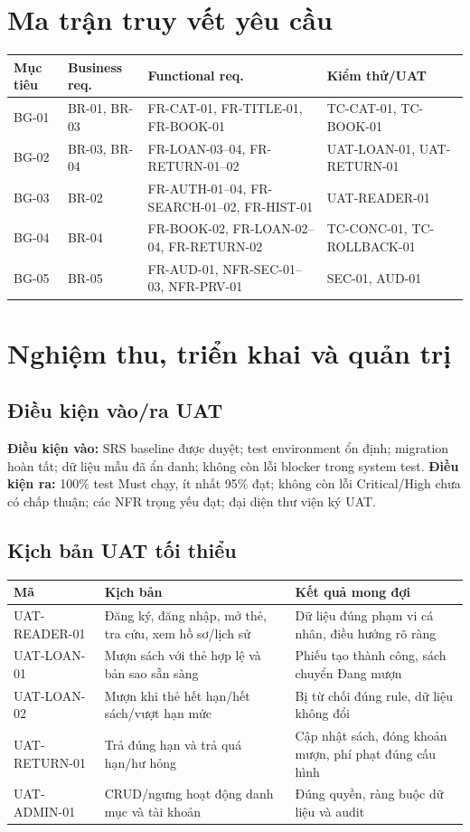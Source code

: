 \documentclass[12pt,a4paper,oneside]{report}
\begin{document}
\chapter{Ma trận truy vết yêu cầu}
\begin{longtable}{L{2cm}L{4.5cm}L{4.1cm}L{3.4cm}}
\toprule Mục tiêu & Business req. & Functional req. & Kiểm thử/UAT\\\midrule\endhead
BG-01 & BR-01, BR-03 & FR-CAT-01, FR-TITLE-01, FR-BOOK-01 & TC-CAT-01, TC-BOOK-01\\
BG-02 & BR-03, BR-04 & FR-LOAN-03--04, FR-RETURN-01--02 & UAT-LOAN-01, UAT-RETURN-01\\
BG-03 & BR-02 & FR-AUTH-01--04, FR-SEARCH-01--02, FR-HIST-01 & UAT-READER-01\\
BG-04 & BR-04 & FR-BOOK-02, FR-LOAN-02--04, FR-RETURN-02 & TC-CONC-01, TC-ROLLBACK-01\\
BG-05 & BR-05 & FR-AUD-01, NFR-SEC-01--03, NFR-PRV-01 & SEC-01, AUD-01\\
\bottomrule
\end{longtable}

\chapter{Nghiệm thu, triển khai và quản trị}
\section{Điều kiện vào/ra UAT}
\textbf{Điều kiện vào:} SRS baseline được duyệt; test environment ổn định; migration hoàn tất; dữ liệu mẫu đã ẩn danh; không còn lỗi blocker trong system test. \textbf{Điều kiện ra:} 100\% test Must chạy, ít nhất 95\% đạt; không còn lỗi Critical/High chưa có chấp thuận; các NFR trọng yếu đạt; đại diện thư viện ký UAT.

\section{Kịch bản UAT tối thiểu}
\begin{longtable}{L{2.5cm}L{7cm}L{5cm}}
\toprule Mã & Kịch bản & Kết quả mong đợi\\\midrule\endhead
UAT-READER-01 & Đăng ký, đăng nhập, mở thẻ, tra cứu, xem hồ sơ/lịch sử & Dữ liệu đúng phạm vi cá nhân, điều hướng rõ ràng\\
UAT-LOAN-01 & Mượn sách với thẻ hợp lệ và bản sao sẵn sàng & Phiếu tạo thành công, sách chuyển Đang mượn\\
UAT-LOAN-02 & Mượn khi thẻ hết hạn/hết sách/vượt hạn mức & Bị từ chối đúng rule, dữ liệu không đổi\\
UAT-RETURN-01 & Trả đúng hạn và trả quá hạn/hư hỏng & Cập nhật sách, đóng khoản mượn, phí phạt đúng cấu hình\\
UAT-ADMIN-01 & CRUD/ngưng hoạt động danh mục và tài khoản & Đúng quyền, ràng buộc dữ liệu và audit\\
\bottomrule
\end{longtable}
\end{document}
